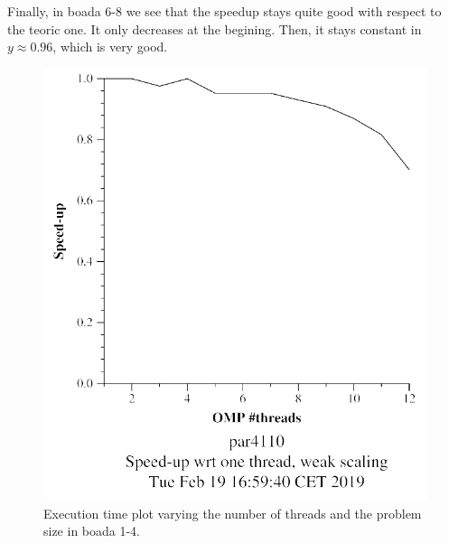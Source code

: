 \documentclass[12pt, a4paper]{article}
\begin{document}
Finally, in boada 6-8 we see that the speedup stays quite good with respect to the teoric one. It only decreases at the begining. Then, it stays constant in $y \approx 0.96$, which is very good.

\begin{figure}[ht]
\begin{minipage}[b]{0.30\linewidth}
\centering
\includegraphics[width=\textwidth]{./images/weak_v1}
\caption{Execution time plot varying the number of threads and the problem size in boada 1-4.}
\label{fig:weak_v1}
\end{minipage}
\hspace{0.5cm}
\begin{minipage}[b]{0.30\linewidth}
\centering

\end{minipage}
\end{figure}
\end{document}
